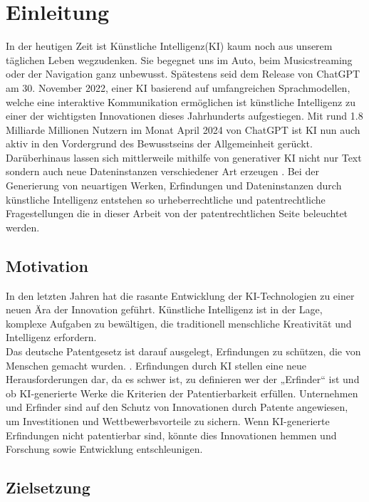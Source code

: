 \chapter{Einleitung \label{cha:chapter1}}

In der heutigen Zeit ist Künstliche Intelligenz(KI) kaum noch aus unserem täglichen Leben wegzudenken. 
Sie begegnet uns im Auto, beim Musicstreaming oder der Navigation ganz unbewusst. 
Spätestens seid dem Release von ChatGPT am 30. November 2022, 
einer KI basierend auf umfangreichen Sprachmodellen, welche eine interaktive Kommunikation ermöglichen 
\cite{ChatGPT} ist künstliche Intelligenz zu einer der wichtigsten Innovationen dieses Jahrhunderts aufgestiegen. 
Mit rund 1.8 Milliarde Millionen Nutzern im Monat April 2024 \cite{NumberChatGPTUsers2023} 
von ChatGPT ist KI nun auch aktiv in den Vordergrund des Bewusstseins der Allgemeinheit gerückt. 
Darüberhinaus lassen sich mittlerweile mithilfe von generativer KI nicht nur Text sondern auch neue 
Dateninstanzen verschiedener Art erzeugen \cite{WasIstKuenstliche}. Bei der Generierung von neuartigen Werken, 
Erfindungen und Dateninstanzen durch künstliche Intelligenz entstehen so urheberrechtliche und 
patentrechtliche Fragestellungen die in dieser Arbeit von der patentrechtlichen Seite beleuchtet werden.

\section{Motivation\label{sec:moti}}

In den letzten Jahren hat die rasante Entwicklung der KI-Technologien zu einer neuen Ära der Innovation geführt. 
Künstliche Intelligenz ist in der Lage, komplexe Aufgaben zu bewältigen, 
die traditionell menschliche Kreativität und Intelligenz erfordern. 
\\

Das deutsche Patentgesetz ist darauf ausgelegt, 
Erfindungen zu schützen, die von Menschen gemacht wurden. 
\cite{DPMAPatentschutz}. Erfindungen durch KI stellen eine neue Herausforderungen dar, 
da es schwer ist, zu definieren wer der „Erfinder“ ist und ob 
KI-generierte Werke die Kriterien der Patentierbarkeit erfüllen. 
Unternehmen und Erfinder sind auf den Schutz von Innovationen durch 
Patente angewiesen, um Investitionen und Wettbewerbsvorteile zu sichern. 
Wenn KI-generierte Erfindungen nicht patentierbar sind, 
könnte dies Innovationen hemmen und Forschung sowie Entwicklung entschleunigen. 


\section{Zielsetzung\label{sec:objective}}

